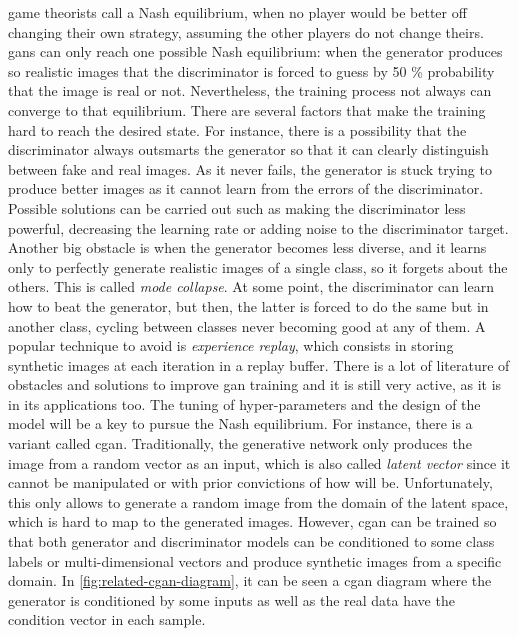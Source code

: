 \documentclass[11pt, a4paper]{article}
\begin{document}
	game theorists call a Nash equilibrium, when no player would be better off changing their own strategy, assuming the other players do not change theirs. \gls{gan}s can only reach one possible Nash equilibrium: when the generator produces so realistic images that the discriminator is forced to guess by 50 \% probability that the image is real or not. Nevertheless, the training process not always can converge to that equilibrium. There are several factors that make the training hard to reach the desired state. For instance, there is a possibility that the discriminator always outsmarts the generator so that it can clearly distinguish between fake and real images. As it never fails, the generator is stuck trying to produce better images as it cannot learn from the errors of the discriminator. Possible solutions can be carried out such as making the discriminator less powerful, decreasing the learning rate or adding noise to the discriminator target. Another big obstacle is when the generator becomes less diverse, and it learns only to perfectly generate realistic images of a single class, so it forgets about the others. This is  called \textit{mode collapse}. At some point, the discriminator can learn how to beat the generator, but then, the latter is forced to do the same but in another class, cycling between classes never becoming good at any of them. A popular technique to avoid is \textit{experience replay}, which consists in storing synthetic images at each iteration in a replay buffer. There is a lot of literature of obstacles and solutions to improve \gls{gan} training and it is still very active, as it is in its applications too. The tuning of hyper-parameters and the design of the model will be a key to pursue the Nash equilibrium. For instance, there is a variant called \gls{cgan}. Traditionally, the generative network only produces the image from a random vector as an input, which is also called \textit{latent vector} since it cannot be manipulated or with prior convictions of how will be. Unfortunately, this only allows to generate a random image from the domain of the latent space, which is hard to map to the generated images. However, \gls{cgan} can be trained so that both generator and discriminator models can be conditioned to some class labels or multi-dimensional vectors and produce synthetic images from a specific domain. In \ref{fig:related-cgan-diagram}, it can be seen a \gls{cgan} diagram where the generator is conditioned by some inputs as well as the real data have the condition vector in each sample.
\end{document}
